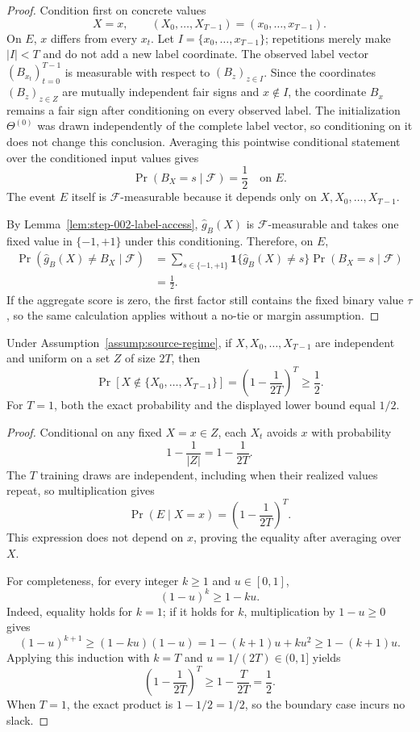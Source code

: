 \begin{proof}
Condition first on concrete values
\[
X=x,\qquad (X_0,\ldots,X_{T-1})=(x_0,\ldots,x_{T-1}).
\]
On $E$, $x$ differs from every $x_t$.  Let
$I=\{x_0,\ldots,x_{T-1}\}$; repetitions merely make $|I|<T$ and do not
add a new label coordinate.  The observed label vector
$(B_{x_t})_{t=0}^{T-1}$ is measurable with respect to $(B_z)_{z\in I}$.
Since the coordinates $(B_z)_{z\in Z}$ are mutually independent fair signs
and $x\notin I$, the coordinate $B_x$ remains a fair sign after conditioning
on every observed label.  The initialization $\Theta^{(0)}$ was drawn
independently of the complete label vector, so conditioning on it does not
change this conclusion.  Averaging this pointwise conditional statement over
the conditioned input values gives
\[
\Pr(B_X=s\mid\mathscr F)=\frac12
\quad\text{on }E.
\]
The event $E$ itself is $\mathscr F$-measurable because it depends only on
$X,X_0,\ldots,X_{T-1}$.

By Lemma~\ref{lem:step-002-label-access}, $\widehat g_B(X)$ is
$\mathscr F$-measurable and takes one fixed value in $\{-1,+1\}$ under this
conditioning.  Therefore, on $E$,
\[
\begin{aligned}
\Pr\!\left(\widehat g_B(X)\ne B_X\mid\mathscr F\right)
&=\sum_{s\in\{-1,+1\}}
\mathbf 1\{\widehat g_B(X)\ne s\}
\Pr(B_X=s\mid\mathscr F)\\
&=\frac12.
\end{aligned}
\]
If the aggregate score is zero, the first factor still contains the fixed
binary value $\tau$, so the same calculation applies without a no-tie or
margin assumption.
\end{proof}

\begin{lemma}
\label{lem:step-002-avoidance}
Under Assumption~\ref{assump:source-regime}, if $X,X_0,\ldots,X_{T-1}$ are
independent and uniform on a set $Z$ of size $2T$, then
\[
\Pr\!\left[X\notin\{X_0,\ldots,X_{T-1}\}\right]
=\left(1-\frac1{2T}\right)^T\geq\frac12.
\]
For $T=1$, both the exact probability and the displayed lower bound equal
$1/2$.
\end{lemma}

\begin{proof}
Conditional on any fixed $X=x\in Z$, each $X_t$ avoids $x$ with probability
\[
1-\frac1{|Z|}=1-\frac1{2T}.
\]
The $T$ training draws are independent, including when their realized values
repeat, so multiplication gives
\[
\Pr(E\mid X=x)=\left(1-\frac1{2T}\right)^T.
\]
This expression does not depend on $x$, proving the equality after averaging
over $X$.

For completeness, for every integer $k\geq 1$ and $u\in[0,1]$,
\[
(1-u)^k\geq 1-ku.
\]
Indeed, equality holds for $k=1$; if it holds for $k$, multiplication by
$1-u\geq 0$ gives
\[
(1-u)^{k+1}\geq(1-ku)(1-u)
=1-(k+1)u+ku^2\geq1-(k+1)u.
\]
Applying this induction with $k=T$ and $u=1/(2T)\in(0,1]$ yields
\[
\left(1-\frac1{2T}\right)^T
\geq1-\frac{T}{2T}=\frac12.
\]
When $T=1$, the exact product is $1-1/2=1/2$, so the boundary case incurs
no slack.
\end{proof}

